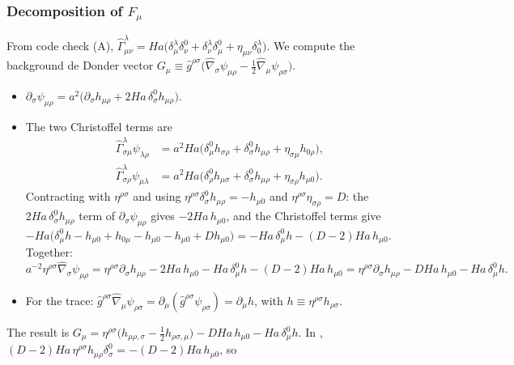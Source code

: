 \subsubsection{\texorpdfstring{Decomposition of $F_\mu$}{Decomposition of F}}
\tD{}
From code check (A), $\hat\Gamma^\lambda_{\mu\nu}=Ha\big(\delta^\lambda_\mu\delta^0_\nu+\delta^\lambda_\nu\delta^0_\mu+\eta_{\mu\nu}\delta^\lambda_0\big)$.
We compute the background de Donder vector
$G_\mu\equiv\hat g^{\rho\sigma}\big(\hat\nabla_\sigma\psi_{\mu\rho}-\tfrac12\hat\nabla_\mu\psi_{\rho\sigma}\big)$.
\begin{itemize}[leftmargin=14pt]
\item $\partial_\sigma\psi_{\mu\rho}=a^2\big(\partial_\sigma h_{\mu\rho}+2Ha\,\delta^0_\sigma h_{\mu\rho}\big)$.
\item The two Christoffel terms are
\begin{equation*}
\begin{aligned}
\hat\Gamma^\lambda_{\sigma\mu}\psi_{\lambda\rho}&=a^2Ha\big(\delta^0_\mu h_{\sigma\rho}+\delta^0_\sigma h_{\mu\rho}+\eta_{\sigma\mu}h_{0\rho}\big),\\
\hat\Gamma^\lambda_{\sigma\rho}\psi_{\mu\lambda}&=a^2Ha\big(\delta^0_\rho h_{\mu\sigma}+\delta^0_\sigma h_{\mu\rho}+\eta_{\sigma\rho}h_{\mu0}\big).
\end{aligned}
\end{equation*}
Contracting with $\eta^{\rho\sigma}$ and using $\eta^{\rho\sigma}\delta^0_\sigma h_{\mu\rho}=-h_{\mu0}$ and $\eta^{\rho\sigma}\eta_{\sigma\rho}=D$:
the $2Ha\,\delta^0_\sigma h_{\mu\rho}$ term of $\partial_\sigma\psi_{\mu\rho}$ gives $-2Ha\,h_{\mu0}$,
and the Christoffel terms give $-Ha\big(\delta^0_\mu h-h_{\mu0}+h_{0\mu}-h_{\mu0}-h_{\mu0}+Dh_{\mu0}\big)=-Ha\,\delta^0_\mu h-(D-2)Ha\,h_{\mu0}$. Together:
\begin{equation*}
a^{-2}\eta^{\rho\sigma}\hat\nabla_\sigma\psi_{\mu\rho}=\eta^{\rho\sigma}\partial_\sigma h_{\mu\rho}-2Ha\,h_{\mu0}-Ha\,\delta^0_\mu h-(D-2)Ha\,h_{\mu0}
=\eta^{\rho\sigma}\partial_\sigma h_{\mu\rho}-DHa\,h_{\mu0}-Ha\,\delta^0_\mu h .
\end{equation*}
\item For the trace: $\hat g^{\rho\sigma}\hat\nabla_\mu\psi_{\rho\sigma}=\partial_\mu(\hat g^{\rho\sigma}\psi_{\rho\sigma})=\partial_\mu h$, with $h\equiv\eta^{\rho\sigma}h_{\rho\sigma}$.
\end{itemize}
The result is $G_\mu=\eta^{\rho\sigma}\big(h_{\mu\rho,\sigma}-\tfrac12h_{\rho\sigma,\mu}\big)-DHa\,h_{\mu0}-Ha\,\delta^0_\mu h$.
In , $(D-2)Ha\,\eta^{\rho\sigma}h_{\mu\rho}\delta^0_\sigma=-(D-2)Ha\,h_{\mu0}$, so
